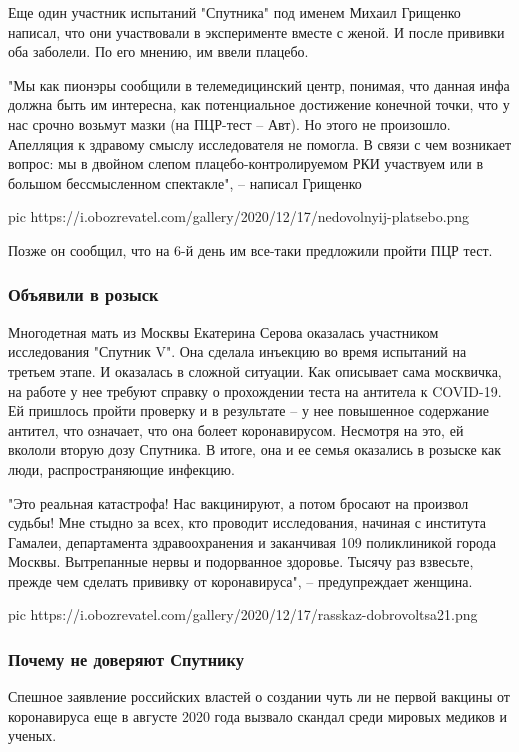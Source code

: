 Еще один участник испытаний "Спутника" под именем Михаил Грищенко написал, что
они участвовали в эксперименте вместе с женой. И после прививки оба заболели.
По его мнению, им ввели плацебо.

"Мы как пионэры сообщили в телемедицинский центр, понимая, что данная инфа
должна быть им интересна, как потенциальное достижение конечной точки, что у
нас срочно возьмут мазки (на ПЦР-тест – Авт). Но этого не произошло. Апелляция
к здравому смыслу исследователя не помогла. В связи с чем возникает вопрос: мы
в двойном слепом плацебо-контролируемом РКИ участвуем или в большом
бессмысленном спектакле", – написал Грищенко

\ifcmt
pic https://i.obozrevatel.com/gallery/2020/12/17/nedovolnyij-platsebo.png
\fi

Позже он сообщил, что на 6-й день им все-таки предложили пройти ПЦР тест.

\subsubsection{Объявили в розыск}

Многодетная мать из Москвы Екатерина Серова оказалась участником исследования
"Спутник V". Она сделала инъекцию во время испытаний на третьем этапе. И
оказалась в сложной ситуации. Как описывает сама москвичка, на работе у нее
требуют справку о прохождении теста на антитела к COVID-19. Ей пришлось пройти
проверку и в результате – у нее повышенное содержание антител, что означает,
что она болеет коронавирусом. Несмотря на это, ей вкололи вторую дозу Спутника.
В итоге, она и ее семья оказались в розыске как люди, распространяющие
инфекцию.

"Это реальная катастрофа! Нас вакцинируют, а потом бросают на произвол судьбы!
Мне стыдно за всех, кто проводит исследования, начиная с института Гамалеи,
департамента здравоохранения и заканчивая 109 поликлиникой города Москвы.
Вытрепанные нервы и подорванное здоровье. Тысячу раз взвесьте, прежде чем
сделать прививку от коронавируса", – предупреждает женщина.

\ifcmt
pic https://i.obozrevatel.com/gallery/2020/12/17/rasskaz-dobrovoltsa21.png
\fi

\subsubsection{Почему не доверяют Спутнику}

Спешное заявление российских властей о создании чуть ли не первой вакцины от
коронавируса еще в августе 2020 года вызвало скандал среди мировых медиков и
ученых.

